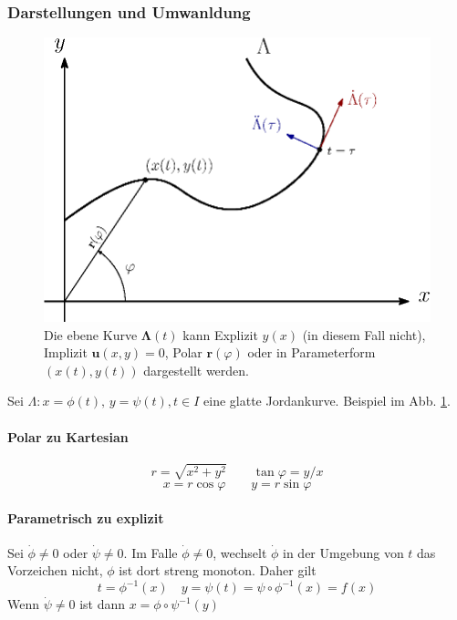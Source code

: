 \documentclass[a4paper, twocolumn]{article}
\numberwithin{equation}{subsection}
\renewcommand{\vec}[1]{\ensuremath{\bm{#1}}}
\begin{document}
\subsubsection{Darstellungen und Umwanldung}
\begin{figure}[h]
\centering
\includegraphics[width=.9\linewidth]{fig/plane-curve.eps}
\caption{Die ebene Kurve \(\vec{\Lambda}(t)\) kann Explizit \(y(x)\) (in diesem Fall nicht), Implizit \(\vec{u}(x,y) = 0\), Polar \(\vec{r}(\varphi)\) oder in Parameterform \((x(t), y(t))\) dargestellt werden.}
\label{fig:plane-curve}
\end{figure}

Sei \(\Lambda: x = \phi(t),\, y = \psi(t), t\in I\) eine glatte Jordankurve.
Beispiel im Abb. \ref{fig:plane-curve}.

\paragraph{Polar zu Kartesian}
\[
    r = \sqrt{x^2 + y^2}
    \qquad
    \tan\varphi = y/x
\]
\[
    x = r \cos\varphi
    \qquad
    y = r \sin\varphi
\]

\paragraph{Parametrisch zu explizit}
Sei \(\dot{\phi} \neq 0\) oder \(\dot{\psi} \neq 0\). Im Falle \(\dot{\phi} \neq 0\), wechselt \(\dot\phi\) in der Umgebung von \(t\) das Vorzeichen nicht, \(\phi\) ist dort streng monoton.
Daher gilt
\[
    t = \phi^{-1}(x) \quad y = \psi(t) = \psi \circ \phi^{-1}(x) = f(x)
\]
Wenn \(\dot{\psi} \neq 0\) ist dann \(x = \phi \circ \psi^{-1}(y)\)
\end{document}
